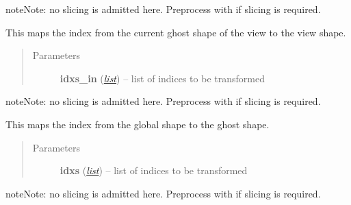 \documentclass[a4paper,10pt,english]{sphinxmanual}
\begin{document}
\begin{fulllineitems}
\begin{fulllineitems}
\begin{notice}{note}{Note:}
no slicing is admitted here. Preprocess  with  if slicing is required.
\end{notice}

\end{fulllineitems}


\begin{fulllineitems}
\label{api-tw:TensorToolbox.core.TensorWrapper.ghost_to_view}
This maps the index from the current ghost shape of the view to the view shape.
\begin{quote}\begin{description}
\item[{Parameters}] \leavevmode
\textbf{idxs\_in} (\href{http://docs.python.org/library/functions.html\#list}{\emph{list}}) -- list of indices to be transformed

\end{description}\end{quote}

\begin{notice}{note}{Note:}
no slicing is admitted here. Preprocess  with  if slicing is required.
\end{notice}

\end{fulllineitems}


\begin{fulllineitems}
\label{api-tw:TensorToolbox.core.TensorWrapper.global_to_ghost}
This maps the index from the global shape to the ghost shape.
\begin{quote}\begin{description}
\item[{Parameters}] \leavevmode
\textbf{idxs} (\href{http://docs.python.org/library/functions.html\#list}{\emph{list}}) -- list of indices to be transformed

\end{description}\end{quote}

\begin{notice}{note}{Note:}
no slicing is admitted here. Preprocess  with  if slicing is required.
\end{notice}


\end{fulllineitems}
\end{fulllineitems}
\end{document}
